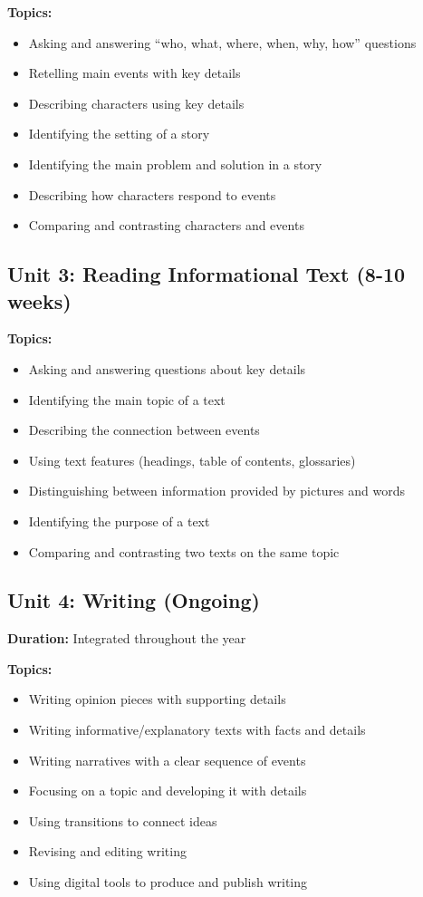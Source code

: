 \documentclass[11pt,letterpaper]{report}
\begin{document}
\textbf{Topics:}
\begin{itemize}
    \item Asking and answering ``who, what, where, when, why, how'' questions
    \item Retelling main events with key details
    \item Describing characters using key details
    \item Identifying the setting of a story
    \item Identifying the main problem and solution in a story
    \item Describing how characters respond to events
    \item Comparing and contrasting characters and events
\end{itemize}

\subsection{Unit 3: Reading Informational Text (8-10 weeks)}

\textbf{Topics:}
\begin{itemize}
    \item Asking and answering questions about key details
    \item Identifying the main topic of a text
    \item Describing the connection between events
    \item Using text features (headings, table of contents, glossaries)
    \item Distinguishing between information provided by pictures and words
    \item Identifying the purpose of a text
    \item Comparing and contrasting two texts on the same topic
\end{itemize}

\subsection{Unit 4: Writing (Ongoing)}

\textbf{Duration:} Integrated throughout the year

\textbf{Topics:}
\begin{itemize}
    \item Writing opinion pieces with supporting details
    \item Writing informative/explanatory texts with facts and details
    \item Writing narratives with a clear sequence of events
    \item Focusing on a topic and developing it with details
    \item Using transitions to connect ideas
    \item Revising and editing writing
    \item Using digital tools to produce and publish writing
\end{itemize}
\end{document}
